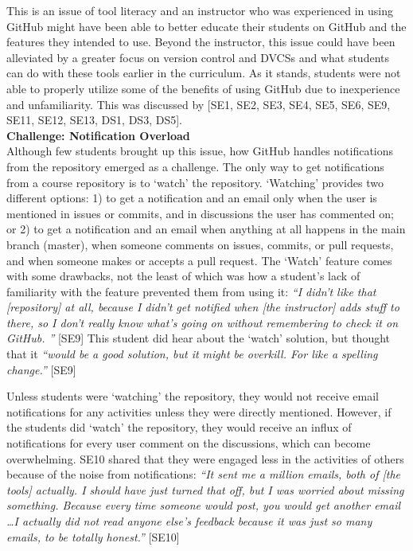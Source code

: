 

This is an issue of tool literacy and an instructor who was experienced in using GitHub might have been able to better educate their students on GitHub and the features they intended to use. Beyond the instructor, this issue could have been alleviated by a greater focus on version control and DVCSs and what students can do with these tools earlier in the curriculum. As it stands, students were not able to properly utilize some of the benefits of using GitHub due to inexperience and unfamiliarity. This was discussed by [SE1, SE2, SE3, SE4, SE5, SE6, SE9, SE11, SE12, SE13, DS1, DS3, DS5]. \\

\textbf{Challenge: Notification Overload} \\
Although few students brought up this issue, how GitHub handles notifications from the repository emerged as a challenge. The only way to get notifications from a course repository is to `watch' the repository. `Watching' provides two different options: 1) to get a notification and an email only when the user is mentioned in issues or commits, and in discussions the user has commented on; or 2) to get a notification and an email when anything at all happens in the main branch (master), when someone comments on issues, commits, or pull requests, and when someone makes or accepts a pull request. The `Watch' feature comes with some drawbacks, not the least of which was how a student's lack of familiarity with the feature prevented them from using it: \textit{``I didn't like that [repository] at all, because I didn't get notified when [the instructor] adds stuff to there, so I don't really know what's going on without remembering to check it on GitHub. ''} [SE9] This student did hear about the `watch' solution, but thought that it \textit{``would be a good solution, but it might be overkill. For like a spelling change.''} [SE9]

Unless students were `watching' the repository, they would not receive email notifications for any activities unless they were directly mentioned. However, if the students did `watch' the repository, they would receive an influx of notifications for every user comment on the discussions, which can become overwhelming. SE10 shared that they were engaged less in the activities of others because of the noise from notifications: \textit{``It sent me a million emails, both of [the tools] actually. I should have just turned that off, but I was worried about missing something. Because every time someone would post, you would get another email \ldots I actually did not read anyone else's feedback because it was just so many emails, to be totally honest.''} [SE10]


